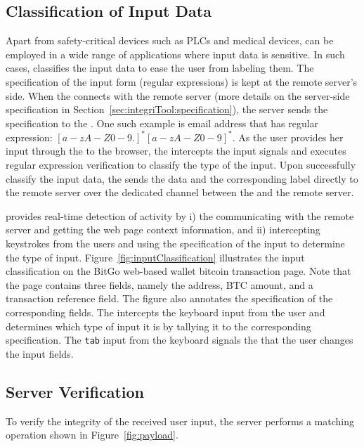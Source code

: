 \subsection{Classification of Input Data}

Apart from safety-critical devices such as PLCs and medical devices, \name can be employed in a wide range of applications where input data is sensitive. In such cases, \device classifies the input data to ease the user from labeling them. The specification of the input form (regular expressions) is kept at the remote server's side. When the \device connects with the remote server (more details on the server-side specification in Section~\ref{sec:integriTool:specification}), the server sends the specification to the \device. One such example is email address that has regular expression: $[a-zA-Z0-9.]^*[a-zA-Z0-9]^*$. As the user provides her input through the \device to the browser, the \device intercepts the input signals and executes regular expression verification to classify the type of the input. Upon successfully classify the input data, the \device sends the data and the corresponding label directly to the remote server over the dedicated \tls channel between the \device and the remote server.

 \name provides real-time detection of activity by i) the \device communicating with the remote server and getting the web page context information, and ii) intercepting keystrokes from the users and using the specification of the input to determine the type of input. Figure~\ref{fig:inputClassification} illustrates the input classification on the BitGo web-based wallet bitcoin transaction page. Note that the page contains three fields, namely the address, BTC amount, and a transaction reference field. The figure also annotates the specification of the corresponding fields. The \device intercepts the keyboard input from the user and determines which type of input it is by tallying it to the corresponding specification. The \texttt{tab} input from the keyboard signals the \device that the user changes the input fields.  
\fi

\subsection{Server Verification}
\label{sec:integriKey:server} 

To verify the integrity of the received user input, the server performs a matching operation shown in Figure~\ref{fig:payload}. 

